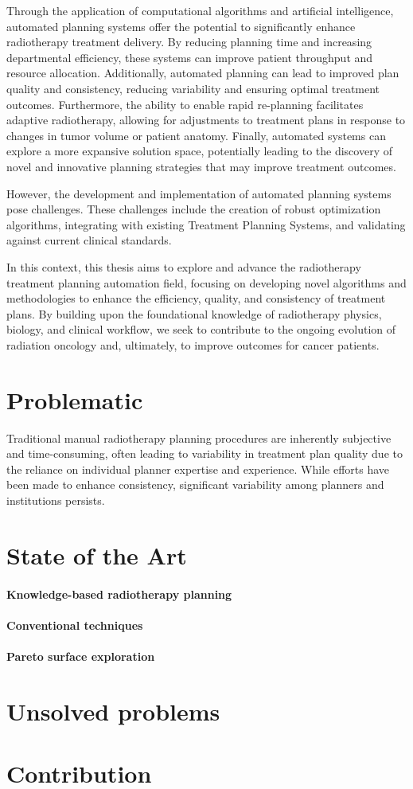 Through the application of computational algorithms and artificial intelligence, automated planning systems offer the potential to significantly enhance radiotherapy treatment delivery.
By reducing planning time and increasing departmental efficiency, these systems can improve patient throughput and resource allocation.
Additionally, automated planning can lead to improved plan quality and consistency, reducing variability and ensuring optimal treatment outcomes.
Furthermore, the ability to enable rapid re-planning facilitates adaptive radiotherapy, allowing for adjustments to treatment plans in response to changes in tumor volume or patient anatomy.
Finally, automated systems can explore a more expansive solution space, potentially leading to the discovery of novel and innovative planning strategies that may improve treatment outcomes.

However, the development and implementation of automated planning systems pose challenges.
These challenges include the creation of robust optimization algorithms, integrating with existing Treatment Planning Systems, and validating against current clinical standards.

In this context, this thesis aims to explore and advance the radiotherapy treatment planning automation field, focusing on developing novel algorithms and methodologies to enhance the efficiency, quality, and consistency of treatment plans.
By building upon the foundational knowledge of radiotherapy physics, biology, and clinical workflow, we seek to contribute to the ongoing evolution of radiation oncology and, ultimately, to improve outcomes for cancer patients.

\section{Problematic}
Traditional manual radiotherapy planning procedures are inherently subjective and time-consuming, often leading to variability in treatment plan quality due to the reliance on individual planner expertise and experience.
While efforts have been made to enhance consistency, significant variability among planners and institutions persists.

\section{State of the Art}
\paragraph{Knowledge-based radiotherapy planning}

\paragraph{Conventional techniques}

\paragraph{Pareto surface exploration}

\section{Unsolved problems}

\section{Contribution}
